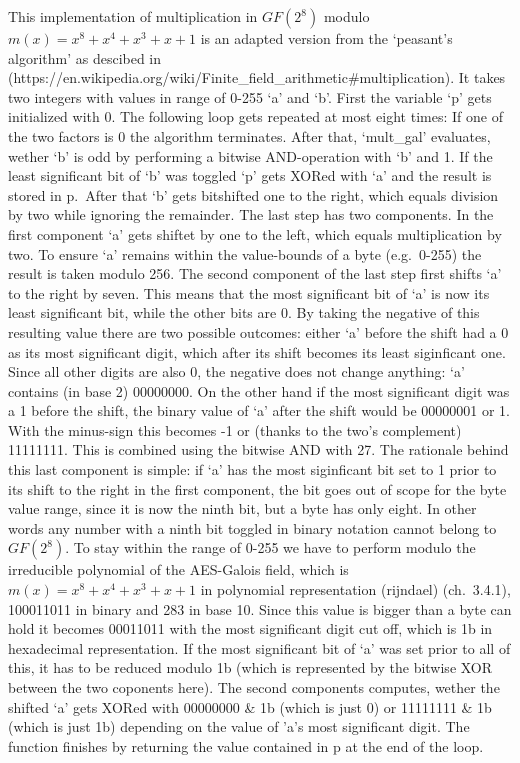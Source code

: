This implementation of multiplication in $GF(2^{8})$ modulo $m(x) = x^8 + x^4 +
x^3 + x + 1$ is an adapted version from the `peasant's algorithm' as
descibed in
(https://en.wikipedia.org/wiki/Finite\_field\_arithmetic\#multiplication).
It takes two integers with values in range of 0-255 `a' and `b'. First
the variable `p' gets initialized with 0. The following loop gets
repeated at most eight times: If one of the two factors is 0 the
algorithm terminates. After that, `mult\_gal' evaluates, wether `b' is
odd by performing a bitwise AND-operation with `b' and 1. If the least
significant bit of `b' was toggled `p' gets XORed with `a' and the
result is stored in p.~After that `b' gets bitshifted one to the right,
which equals division by two while ignoring the remainder. The last step
has two components. In the first component `a' gets shiftet by one to
the left, which equals multiplication by two. To ensure `a' remains
within the value-bounds of a byte (e.g.~0-255) the result is taken
modulo 256. The second component of the last step first shifts `a' to
the right by seven. This means that the most significant bit of `a' is
now its least significant bit, while the other bits are 0. By taking the
negative of this resulting value there are two possible outcomes: either
`a' before the shift had a 0 as its most significant digit, which after
its shift becomes its least siginficant one. Since all other digits are
also 0, the negative does not change anything: `a' contains (in base 2)
00000000. On the other hand if the most significant digit was a 1 before
the shift, the binary value of `a' after the shift would be 00000001 or
1. With the minus-sign this becomes -1 or (thanks to the two's
complement) 11111111. This is combined using the bitwise AND with 27.
The rationale behind this last component is simple: if `a' has the most
siginficant bit set to 1 prior to its shift to the right in the first
component, the bit goes out of scope for the byte value range, since it
is now the ninth bit, but a byte has only eight. In other words any
number with a ninth bit toggled in binary notation cannot belong to
$GF(2^{8})$. To stay within the range of 0-255 we have to perform modulo the
irreducible polynomial of the AES-Galois field, which is $m(x) = x^8 + x^4 +
x^3 + x + 1$ in polynomial representation (rijndael) (ch.~3.4.1),
100011011 in binary and 283 in base 10. Since this value is bigger than
a byte can hold it becomes 00011011 with the most significant digit cut
off, which is 1b in hexadecimal representation. If the most significant
bit of `a' was set prior to all of this, it has to be reduced modulo 1b
(which is represented by the bitwise XOR between the two coponents
here). The second components computes, wether the shifted `a' gets XORed
with 00000000 \& 1b (which is just 0) or 11111111 \& 1b (which is just
1b) depending on the value of 'a's most significant digit. The function
finishes by returning the value contained in p at the end of the loop.

